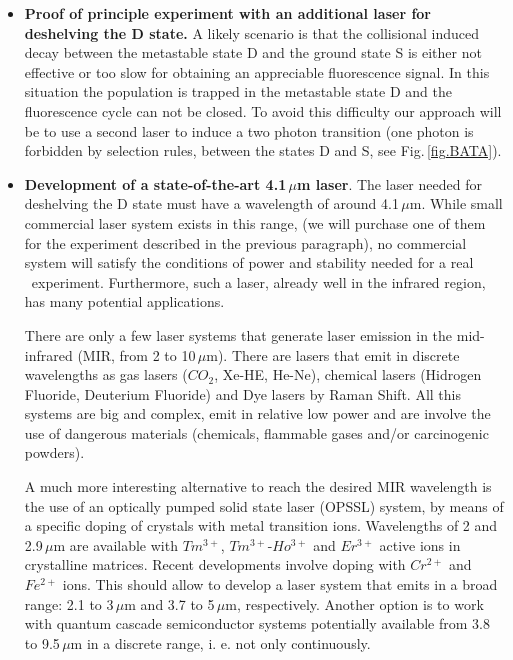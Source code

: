\begin{itemize}
	\item \textbf{Proof of principle experiment with an additional laser for deshelving the D state.}
A likely scenario is that the collisional induced decay between the metastable state D and the ground state S is either not effective or too slow for obtaining an appreciable fluorescence signal. In this situation the population is trapped in the metastable state D  and the fluorescence cycle can not be closed. To avoid this difficulty our approach will be to use a second laser to induce a two photon transition (one photon is forbidden by selection rules, between the states D and S, see Fig.\,\ref{fig.BATA}). 

\item \textbf{Development of a state-of-the-art 4.1\,$\mu$m laser}. The laser needed for
deshelving the D state must have a wavelength of around 4.1\,$\mu$m. While small commercial laser system exists in this range, (we will purchase one of them for the experiment described in the previous paragraph), no commercial system will satisfy the conditions of power and stability needed for a real \BATA\ experiment. Furthermore, such a laser, already well in the infrared region, has many potential applications.	

There are only a few laser systems that generate laser emission in the mid-infrared (MIR, from 2 to 10\,$\mu$m). There are lasers that emit in discrete wavelengths as gas lasers ($CO_2$, Xe-HE, He-Ne), chemical lasers (Hidrogen Fluoride, Deuterium Fluoride) and Dye lasers by Raman Shift. All this systems are big and complex, emit in relative low power and are involve the use of dangerous materials (chemicals, flammable gases and/or carcinogenic powders). 

A much more interesting alternative to reach the desired MIR wavelength is the use of an optically pumped solid state laser (OPSSL) system, by means of a specific doping of crystals with metal transition ions. Wavelengths of 2 and 2.9\,$\mu$m are available with $Tm^{3+}$, $Tm^{3+}$-$Ho^{3+}$ and $Er^{3+}$ active ions in crystalline matrices. Recent developments involve doping with $Cr^{2+}$ and $Fe^{2+}$ ions. This should allow to develop a laser system that emits in a broad range: 2.1 to 3\,$\mu$m and 3.7 to 5\,$\mu$m, respectively. Another option is to work with quantum cascade semiconductor systems potentially available from 3.8 to 9.5\,$\mu$m in a discrete range, i. e.  not only continuously. 


\end{itemize}
